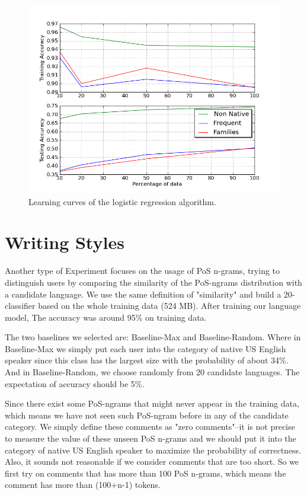 \documentclass[11pt]{article}
\begin{document}
\begin{figure}[htp]
\centering
\includegraphics[scale=0.45]{combined_lc.png}
\caption{Learning curves of the logistic regression algorithm.}
\label{comb_lc}
\end{figure}





\section{Writing Styles}
Another type of Experiment focuses on the usage of PoS n-grams, trying to distinguish users by comparing the similarity of the PoS-ngrams distribution with a candidate language. We use the same definition of "similarity" and build a 20-classifier based on the whole training data (524 MB). After training our language model, The accuracy was around 95\% on training data.

The two baselines we selected are: Baseline-Max and Baseline-Random. Where in Baseline-Max we simply put each user into the category of native US English speaker since this class has the largest size with the
probability of about 34\%. And in Baseline-Random, we choose randomly from 20 candidate languages. The expectation of accuracy should be 5\%.

Since there exist some PoS-ngrams that might never appear in the training data, which means we have not seen such PoS-ngram before in any of the candidate category. We simply define these comments as "zero comments"--it is not precise to measure the value of these unseen PoS n-grams and we should put it into the category of native US English speaker to maximize the probability of correctness. Also, it sounds not reasonable if we consider comments that are too short. So we first try on comments that has more than 100 PoS n-grams, which means the comment has more than (100+n-1) tokens.
\end{document}
